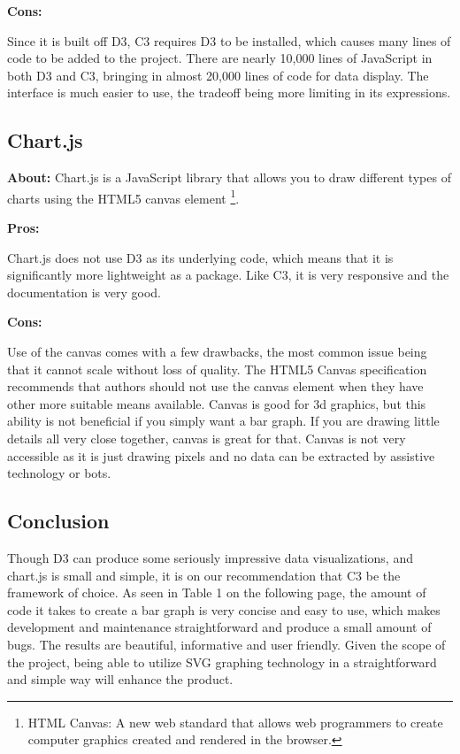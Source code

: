 \documentclass[draftclsnofoot,onecolumn,letterpaper,10pt,compsoc]{IEEEtran}
\begin{document}
    \noindent \textbf{Cons:}

    Since it is built off D3, C3 requires D3 to be installed, which causes many lines of code to be added to the project.
    There are nearly 10,000 lines of JavaScript in both D3 and C3, bringing in almost 20,000 lines of code for data display.
    The interface is much easier to use, the tradeoff being more limiting in its expressions.


    \subsection{Chart.js}
    \textbf{About:}
    Chart.js is a JavaScript library that allows you to draw different types of charts using the HTML5 canvas element
    \footnote{HTML Canvas: A new web standard that allows web programmers to create computer graphics created and rendered in the browser.}.

    \noindent \textbf{Pros:}

    Chart.js does not use D3 as its underlying code, which means that it is significantly more lightweight as a package.\cite{ChartJS} Like C3, it is very responsive and the documentation is very good.

    \noindent \textbf{Cons:}

    Use of the canvas comes with a few drawbacks, the most common issue being that it cannot scale without loss of quality.
    The HTML5 Canvas specification recommends that authors should not use the canvas element when they have other more suitable means available.\cite{CanvasVsSVG}
    Canvas is good for 3d graphics, but this ability is not beneficial if you simply want a bar graph.
    If you are drawing little details all very close together, canvas is great for that.
    Canvas is not very accessible as it is just drawing pixels and no data can be extracted by assistive technology or bots.

  \subsection{Conclusion}

    Though D3 can produce some seriously impressive data visualizations, and chart.js is small and simple, it is on our recommendation that C3 be the framework of choice.
    As seen in Table 1 on the following page, the amount of code it takes to create a bar graph is very concise and easy to use, which makes development and maintenance straightforward and produce a small amount of bugs.
    The results are beautiful, informative and user friendly.
    Given the scope of the project, being able to utilize SVG graphing technology in a straightforward and simple way will enhance the product.
\end{document}
